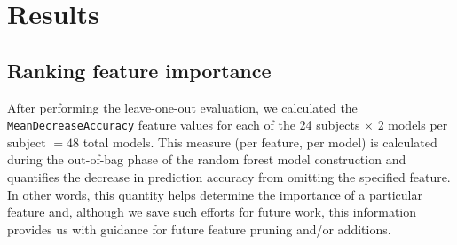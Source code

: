 \documentclass[11pt,]{article}
\begin{document}
\section{Results}\label{results}

\subsection{Ranking feature
importance}\label{ranking-feature-importance}

After performing the leave-one-out
evaluation,
we calculated the \texttt{MeanDecreaseAccuracy} feature values for each
of the 24 subjects \(\times\) 2 models per subject \(=48\) total models.
This measure (per feature, per model) is calculated during the
out-of-bag phase of the random forest model construction and quantifies
the decrease in prediction accuracy from omitting the specified feature.
In other words, this quantity helps determine the importance of a
particular feature and, although we save such efforts for future work,
this information provides us with guidance for future feature pruning
and/or additions.
\end{document}
